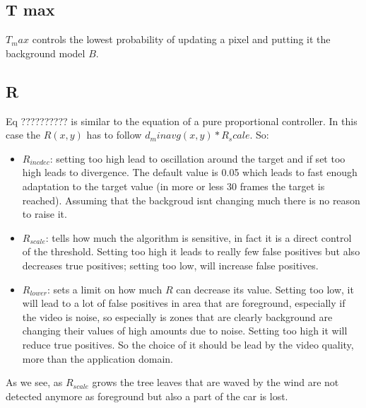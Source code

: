 \subsection*{T max}
$T_max$ controls the lowest probability of updating a pixel and putting it the
background model $B$.


\subsection*{R}
Eq ?????????? is similar to the equation of a pure proportional controller.
In this case the $R(x,y)$ has to follow $d_minavg(x,y) * R_scale$. So:
\begin{itemize}
    \item $R_{incdec}$: setting too high lead to oscillation around the target and if
    set too high leads to divergence. The default value is 0.05 which leads to fast
    enough adaptation to the target value (in more or less 30 frames the target is
    reached). Assuming that the backgroud isnt changing much there is no reason to
    raise it.
    \item $R_{scale}$: tells how much the algorithm is sensitive, in fact it is a direct
    control of the threshold. Setting too high it leads to really few false positives
    but also decreases true positives; setting too low, will increase false positives.
    \item $R_{lower}$: sets a limit on how much $R$ can decrease its value. Setting too
    low, it will lead to a lot of false positives in area that are foreground,
    especially if the video is noise, so especially is zones that are clearly
    background are changing their values of high amounts due to noise. Setting too
    high it will reduce true positives. So the choice of it should be lead by the
    video quality, more than the application domain.
\end{itemize}
\begin{figure}[!t]
    \centering
\end{figure}
As we see, as $R_{scale}$ grows the tree leaves that are waved by the wind are not detected
anymore as foreground but also a part of the car is lost.

